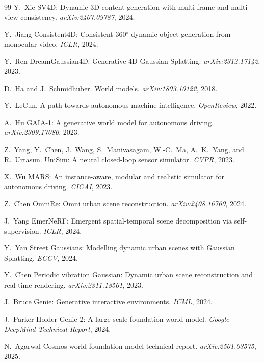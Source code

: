 \begin{thebibliography}{99}
Y.~Xie \etal
SV4D: Dynamic 3D content generation with multi-frame and multi-view
consistency.
\emph{arXiv:2407.09787}, 2024.


Y.~Jiang \etal
Consistent4D: Consistent 360$^\circ$ dynamic object generation from monocular
video.
\emph{ICLR}, 2024.


Y.~Ren \etal
DreamGaussian4D: Generative 4D Gaussian Splatting.
\emph{arXiv:2312.17142}, 2023.


D.~Ha and J.~Schmidhuber.
World models.
\emph{arXiv:1803.10122}, 2018.


Y.~LeCun.
A path towards autonomous machine intelligence.
\emph{OpenReview}, 2022.


A.~Hu \etal
GAIA-1: A generative world model for autonomous driving.
\emph{arXiv:2309.17080}, 2023.


Z.~Yang, Y.~Chen, J.~Wang, S.~Manivasagam, W.-C.~Ma, A.~K.~Yang, and
R.~Urtasun.
UniSim: A neural closed-loop sensor simulator.
\emph{CVPR}, 2023.


X.~Wu \etal
MARS: An instance-aware, modular and realistic simulator for autonomous
driving.
\emph{CICAI}, 2023.


Z.~Chen \etal
OmniRe: Omni urban scene reconstruction.
\emph{arXiv:2408.16760}, 2024.


J.~Yang \etal
EmerNeRF: Emergent spatial-temporal scene decomposition via self-supervision.
\emph{ICLR}, 2024.


Y.~Yan \etal
Street Gaussians: Modelling dynamic urban scenes with Gaussian Splatting.
\emph{ECCV}, 2024.


Y.~Chen \etal
Periodic vibration Gaussian: Dynamic urban scene reconstruction and real-time
rendering.
\emph{arXiv:2311.18561}, 2023.


J.~Bruce \etal
Genie: Generative interactive environments.
\emph{ICML}, 2024.


J.~Parker-Holder \etal
Genie 2: A large-scale foundation world model.
\emph{Google DeepMind Technical Report}, 2024.


N.~Agarwal \etal
Cosmos world foundation model technical report.
\emph{arXiv:2501.03575}, 2025.



\end{thebibliography}

